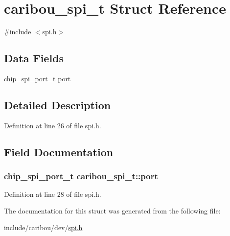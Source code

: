 \hypertarget{structcaribou__spi__t}{\section{caribou\-\_\-spi\-\_\-t Struct Reference}
\label{structcaribou__spi__t}
}


{\ttfamily \#include $<$spi.\-h$>$}

\subsection*{Data Fields}
\begin{DoxyCompactItemize}
\item 
chip\-\_\-spi\-\_\-port\-\_\-t \hyperlink{structcaribou__spi__t_ae1a7630daa892755a8a38a6e9cc8061c}{port}
\end{DoxyCompactItemize}


\subsection{Detailed Description}


Definition at line 26 of file spi.\-h.



\subsection{Field Documentation}
\hypertarget{structcaribou__spi__t_ae1a7630daa892755a8a38a6e9cc8061c}{
\subsubsection[{port}]{\setlength{\rightskip}{0pt plus 5cm}chip\-\_\-spi\-\_\-port\-\_\-t caribou\-\_\-spi\-\_\-t\-::port}}\label{structcaribou__spi__t_ae1a7630daa892755a8a38a6e9cc8061c}


Definition at line 28 of file spi.\-h.



The documentation for this struct was generated from the following file\-:\begin{DoxyCompactItemize}
\item 
include/caribou/dev/\hyperlink{spi_8h}{spi.\-h}\end{DoxyCompactItemize}
